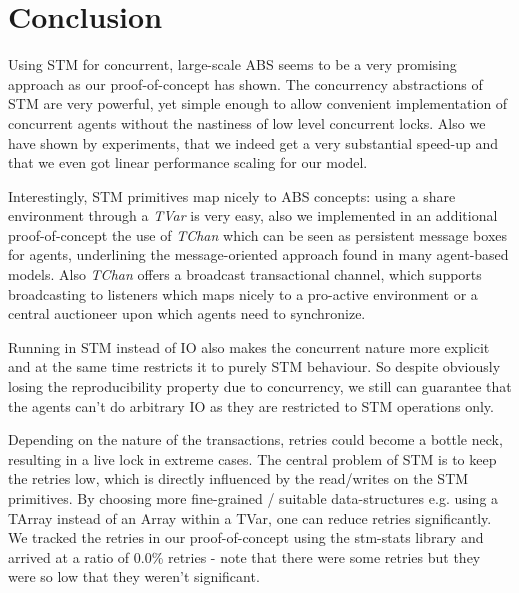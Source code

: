 \section{Conclusion}
Using STM for concurrent, large-scale ABS seems to be a very promising approach as our proof-of-concept has shown. The concurrency abstractions of STM are very powerful, yet simple enough to allow convenient implementation of concurrent agents without the nastiness of low level concurrent locks. Also we have shown by experiments, that we indeed get a very substantial speed-up and that we even got linear performance scaling for our model. 

Interestingly, STM primitives map nicely to ABS concepts: using a share environment through a \textit{TVar} is very easy, also we implemented in an additional proof-of-concept the use of \textit{TChan} which can be seen as persistent message boxes for agents, underlining the message-oriented approach found in many agent-based models. Also \textit{TChan} offers a broadcast transactional channel, which supports broadcasting to listeners which maps nicely to a pro-active environment or a central auctioneer upon which agents need to synchronize.

Running in STM instead of IO also makes the concurrent nature more explicit and at the same time restricts it to purely STM behaviour. So despite obviously losing the reproducibility property due to concurrency, we still can guarantee that the agents can't do arbitrary IO as they are restricted to STM operations only.

Depending on the nature of the transactions, retries could become a bottle neck, resulting in a live lock in extreme cases. The central problem of STM is to keep the retries low, which is directly influenced by the read/writes on the STM primitives. By choosing more fine-grained / suitable data-structures e.g. using a TArray instead of an Array within a TVar, one can reduce retries significantly. We tracked the retries in our proof-of-concept using the stm-stats library and arrived at a ratio of 0.0\% retries - note that there were some retries but they were so low that they weren't significant.